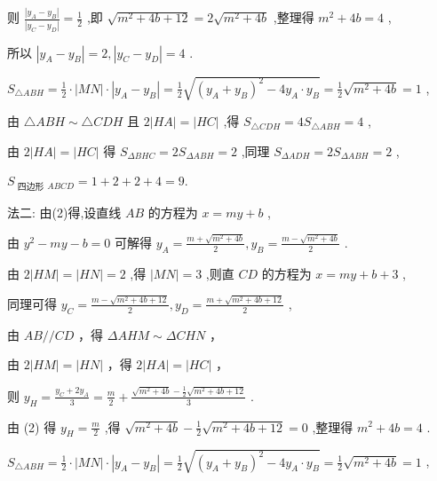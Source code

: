 \documentclass[10pt]{article}
\begin{document}
则 \(\frac{\left| {y}_{A} - {y}_{B}\right| }{\left| {y}_{C} - {y}_{D}\right| } = \frac{1}{2}\) ,即 \(\sqrt{{m}^{2} + {4b} + {12}} = 2\sqrt{{m}^{2} + {4b}}\) ,整理得 \({m}^{2} + {4b} = 4\) ,

所以 \(\left| {{y}_{A} - {y}_{B}}\right|  = 2,\left| {{y}_{C} - {y}_{D}}\right|  = 4\) .

\({S}_{\bigtriangleup {ABH}} = \frac{1}{2} \cdot  \left| {MN}\right|  \cdot  \left| {{y}_{A} - {y}_{B}}\right|  = \frac{1}{2}\sqrt{{\left( {y}_{A} + {y}_{B}\right) }^{2} - 4{y}_{A} \cdot  {y}_{B}} = \frac{1}{2}\sqrt{{m}^{2} + {4b}} = 1\) ,

由 \(\bigtriangleup {ABH} \sim  \bigtriangleup {CDH}\) 且 \(2\left| {HA}\right|  = \left| {HC}\right|\) ,得 \({S}_{\bigtriangleup {CDH}} = 4{S}_{\bigtriangleup {ABH}} = 4\) ,

由 \(2\left| {HA}\right|  = \left| {HC}\right|\) 得 \({S}_{\Delta BHC} = 2{S}_{\Delta ABH} = 2\) ,同理 \({S}_{\Delta ADH} = 2{S}_{\Delta ABH} = 2\) ,

\({S}_{\text{ 四边形 }}{}_{ABCD} = 1 + 2 + 2 + 4 = 9.\)

法二: 由(2)得,设直线 \({AB}\) 的方程为 \(x = {my} + b\) ,

由 \({y}^{2} - {my} - b = 0\) 可解得 \({y}_{A} = \frac{m + \sqrt{{m}^{2} + {4b}}}{2},{y}_{B} = \frac{m - \sqrt{{m}^{2} + {4b}}}{2}\) .

由 \(2\left| {HM}\right|  = \left| {HN}\right|  = 2\) ,得 \(\left| {MN}\right|  = 3\) ,则直 \({CD}\) 的方程为 \(x = {my} + b + 3\) ,

同理可得 \({y}_{C} = \frac{m - \sqrt{{m}^{2} + {4b} + {12}}}{2},{y}_{D} = \frac{m + \sqrt{{m}^{2} + {4b} + {12}}}{2}\) ,

由 \({AB}//{CD}\) ，得 \({\Delta AHM} \sim  {\Delta CHN}\) ，

由 \(2\left| {HM}\right|  = \left| {HN}\right|\) ，得 \(2\left| {HA}\right|  = \left| {HC}\right|\) ，

则 \({y}_{H} = \frac{{y}_{C} + 2{y}_{A}}{3} = \frac{m}{2} + \frac{\sqrt{{m}^{2} + {4b}} - \frac{1}{2}\sqrt{{m}^{2} + {4b} + {12}}}{3}\) .

由 (2) 得 \({y}_{H} = \frac{m}{2}\) ,得 \(\sqrt{{m}^{2} + {4b}} - \frac{1}{2}\sqrt{{m}^{2} + {4b} + {12}} = 0\) ,整理得 \({m}^{2} + {4b} = 4\) .

\({S}_{\bigtriangleup {ABH}} = \frac{1}{2} \cdot  \left| {MN}\right|  \cdot  \left| {{y}_{A} - {y}_{B}}\right|  = \frac{1}{2}\sqrt{{\left( {y}_{A} + {y}_{B}\right) }^{2} - 4{y}_{A} \cdot  {y}_{B}} = \frac{1}{2}\sqrt{{m}^{2} + {4b}} = 1\) ,
\end{document}

